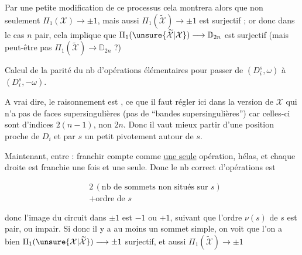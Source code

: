 
Par une petite modification de ce processus cela montrera alors que non seulement $\Pi_1(\mathcal X)\longrightarrow\pm1$, mais aussi $\Pi_1(\widetilde{\mathcal X})\longrightarrow\pm1$ est surjectif ; or donc dans le cas $n$ pair, cela implique que $\Pi_1(\unsure{\widetilde{\mathcal X}|\mathcal X})\longrightarrow\mathbb D_{2n}$ est surjectif (mais peut-être pas $\Pi_1(\widetilde{\mathcal X})\longrightarrow\mathbb D_{2n}$ ?)

Calcul de la parité du nb d'opérations élémentaires pour passer de $(D_i^{s},\omega)$ à $(D_i^{s},-\omega)$.





A vrai dire, le raisonnement est ,  ce que il faut régler ici dans la version de $\mathcal X$ qui n'a pas de faces supersingulières (pas de ``bandes supersingulières'') car celles-ci sont d'indices $2(n-1)$, non $2n$. Donc il vaut mieux partir d'une position proche de $D_i$  et par $s$  un petit pivotement autour de $s$.

Maintenant,  entre : franchir compte comme \uline{une seule} opération, hélas, et chaque droite   est franchie une fois et une seule. Donc le nb correct d'opérations est

\[ \begin{aligned}
&2\,(\text{nb de sommets non situés sur }s)\\
&+\text{ordre de }s
\end{aligned} \]

donc l'image du circuit dans $\pm1$ est $-1$ ou $+1$, suivant que l'ordre  $\nu(s)$ de $s$ est pair, ou impair. Si donc il y a au moins un sommet simple, on voit que l'on a bien $\Pi_1(\unsure{\mathcal X|\widetilde{\mathcal X}})\longrightarrow\pm1$ surjectif, et aussi $\Pi_1(\widetilde{\mathcal X})\longrightarrow\pm1$ 
